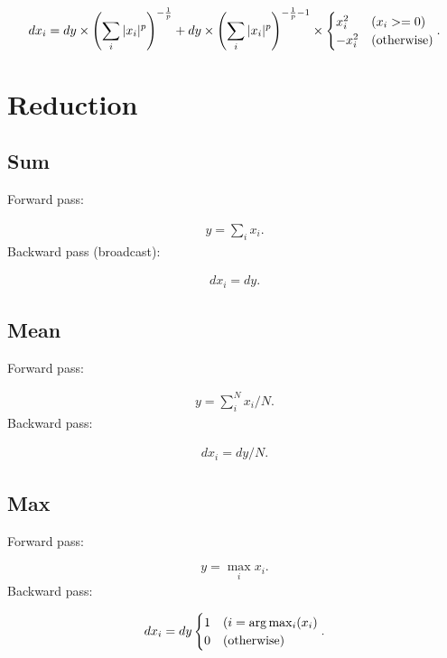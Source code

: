 \documentclass{article}
\begin{document}
\begin{eqnarray}
    dx_i = dy \times \left( \sum_i |x_i|^p \right)^{-\frac{1}{p}} + dy \times \left( \sum_i |x_i|^p \right)^{-\frac{1}{p} - 1} \times
    \begin{cases}
     x_i^2 & (x_i >= 0) \\
     -x_i^2 & ({\rm otherwise})
  \end{cases}. 
\end{eqnarray}

\section{Reduction}
\label{sec:Reduction}

\subsection{Sum}

Forward pass:

\begin{eqnarray}
  y = \sum_{i} x_i.
\end{eqnarray}
%
Backward pass (broadcast):

\begin{eqnarray}
  dx_i = dy.
\end{eqnarray}


\subsection{Mean}

Forward pass:

\begin{eqnarray}
  y = \sum_{i}^{N} x_i / N.
\end{eqnarray}
%
Backward pass:

\begin{eqnarray}
  dx_i = dy / N.
\end{eqnarray}


\subsection{Max}

Forward pass:

\begin{eqnarray}
  y = \max_{i} x_i.
\end{eqnarray}
%
Backward pass:

\begin{eqnarray}
  dx_i = dy \begin{cases}
     1 & (i = \arg\max_i (x_i) \\
     0 & ({\rm otherwise})
  \end{cases}.
\end{eqnarray}
\end{document}
